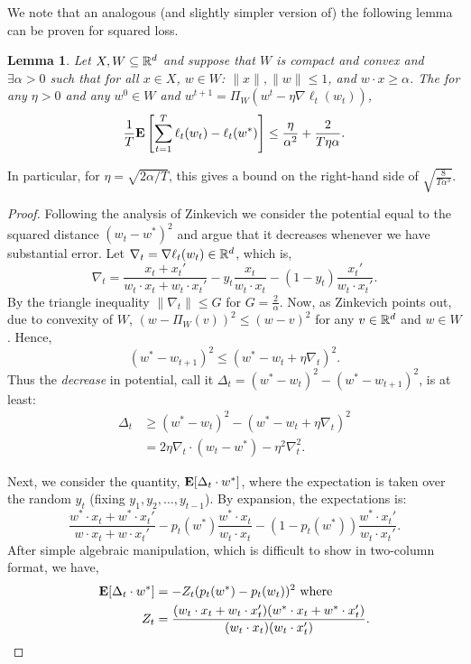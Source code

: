 \documentclass{article}
\newtheorem{lemma}{Lemma}
\begin{document}
We note that an analogous (and slightly simpler version of) the following lemma can be proven for squared loss.
\begin{lemma}
Let $X,W \subseteq \mathbb{R}^d$ and suppose that $W$ is compact and convex and $\exists \alpha >0$ such that for all $x \in X$, $w \in W$:
$\|x\|,\|w\|\leq 1$, and $w \cdot x \geq \alpha$.
The for any $\eta>0$ and any $w^0\in W$ and $w^{t+1}=\Pi_W(w^t-\eta \nabla \ell_t(w_t))$,
$$\frac{1}{T}{\bf E}\left[\sum_{t=1}^T \ell_t(w_t) -\ell_t(w^*)\right] \leq \frac{\eta}{\alpha^2}+\frac{2}{T\eta \alpha}.$$
\end{lemma}
In particular, for $\eta=\sqrt{2\alpha/T}$, this gives a bound on the right-hand side of $\sqrt{\frac{8}{T\alpha^3}}$.
\begin{proof}
Following the analysis of Zinkevich \cite{Zinkevich03} we consider the potential equal to the squared distance $(w_t-w^*)^2$ and argue that it decreases whenever we have substantial error.
Let $\nabla_t = \nabla \ell_t(w_t)\in \mathbb{R}^d$, which is,
$$\nabla_t = \frac{x_t+x_t'}{w_t\cdot x_t+w_t\cdot x_t'} - y_t \frac{x_t}{w_t\cdot x_t} - (1-y_t)\frac{x_t'}{w_t\cdot x_t'}.$$
By the triangle inequality $\|\nabla_t\| \leq G$ for $G=\frac{2}{\alpha}$.  Now, as Zinkevich points out, due to convexity of $W$, $(w-\Pi_W(v))^2\leq (w-v)^2$ for any $v \in \mathbb{R}^d$ and $w \in W$.  Hence,
$$(w^*-w_{t+1})^2 \leq (w^*-w_t+\eta \nabla_t)^2.$$
Thus the {\em decrease} in potential, call it $\Delta_t = (w^*-w_t)^2-(w^*-w_{t+1})^2$, is at least:
\begin{align*}
\Delta_t &\geq (w^*-w_t)^2-(w^*-w_t+\eta \nabla_t)^2 \\
&=2\eta \nabla_t \cdot (w_t-w^*)-\eta^2 \nabla_t^2.
\end{align*}

Next, we consider the quantity,
${\bf E}[ \Delta_t \cdot w^* ]$, where the expectation is taken over the random $y_t$ (fixing $y_1,y_2,\ldots,y_{t-1}$).  By expansion, the expectations is:
$$\frac{w^* \cdot x_t + w^* \cdot x_t'}{w \cdot x_t + w\cdot x_t'} - p_t(w^*) \frac{w^* \cdot x_t}{w_t\cdot x_t} - (1-p_t(w^*))\frac{w^* \cdot x_t'}{w_t\cdot x_t'}.$$
After simple algebraic manipulation, which is difficult to show in two-column format, we have,
\begin{align*}
{\bf E}[\Delta_t \cdot w^*]&=-Z_t(p_t(w^*)-p_t(w_t))^2 \text{ where }\\
Z_t &=\frac{(w_t\cdot x_t+w_t\cdot x_t')(w^*\cdot x_t+w^*\cdot x_t')}{(w_t \cdot x_t)(w_t \cdot x_t')}.
\end{align*}


\end{proof}
\end{document}
